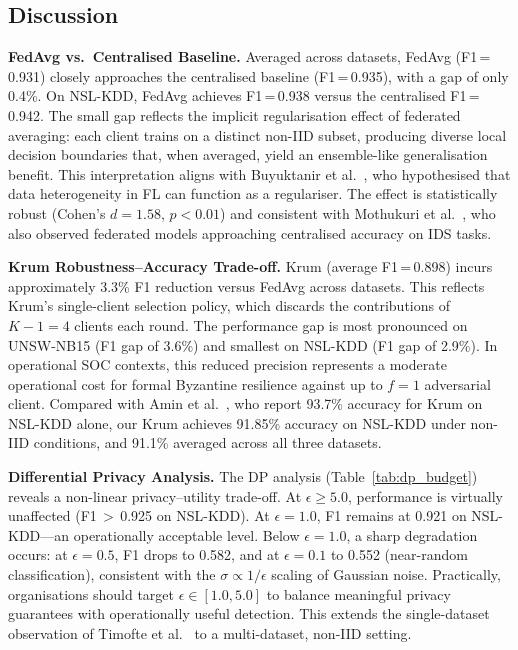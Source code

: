 \documentclass[conference]{IEEEtran}
\begin{document}
\subsection{Discussion}

\textbf{FedAvg vs.\ Centralised Baseline.}
Averaged across datasets, FedAvg (F1\,=\,0.931) closely approaches
the centralised baseline (F1\,=\,0.935), with a gap of only 0.4\%.
On NSL-KDD, FedAvg achieves F1\,=\,0.938 versus the centralised
F1\,=\,0.942. The small gap reflects the implicit regularisation
effect of federated averaging: each client trains on a distinct
non-IID subset, producing diverse local decision boundaries that,
when averaged, yield an ensemble-like generalisation benefit.
This interpretation aligns with Buyuktanir et al.~\cite{buyuktanir2025},
who hypothesised that data heterogeneity in FL can function as a
regulariser.
The effect is statistically robust (Cohen's $d = 1.58$,
$p < 0.01$) and consistent with Mothukuri et al.~\cite{mothukuri2021},
who also observed federated models approaching centralised accuracy on
IDS tasks.

\textbf{Krum Robustness--Accuracy Trade-off.}
Krum (average F1\,=\,0.898) incurs approximately 3.3\% F1 reduction
versus FedAvg across datasets.
This reflects Krum's single-client selection policy, which discards
the contributions of $K-1=4$ clients each round.
The performance gap is most pronounced on UNSW-NB15 (F1 gap of 3.6\%)
and smallest on NSL-KDD (F1 gap of 2.9\%).
In operational SOC contexts, this reduced precision represents a moderate
operational cost for formal Byzantine resilience against up to $f=1$
adversarial client.
Compared with Amin et al.~\cite{amin2025}, who report 93.7\% accuracy
for Krum on NSL-KDD alone, our Krum achieves 91.85\% accuracy on
NSL-KDD under non-IID conditions, and 91.1\% averaged across all
three datasets.

\textbf{Differential Privacy Analysis.}
The DP analysis (Table~\ref{tab:dp_budget}) reveals a non-linear
privacy--utility trade-off.
At $\epsilon \geq 5.0$, performance is virtually unaffected
(F1\,$>$\,0.925 on NSL-KDD).
At $\epsilon = 1.0$, F1 remains at 0.921 on NSL-KDD---an operationally
acceptable level.
Below $\epsilon = 1.0$, a sharp degradation occurs: at $\epsilon=0.5$,
F1 drops to 0.582, and at $\epsilon=0.1$ to 0.552 (near-random
classification), consistent with the $\sigma \propto 1/\epsilon$
scaling of Gaussian noise.
Practically, organisations should target
$\epsilon \in [1.0, 5.0]$ to balance meaningful privacy guarantees
with operationally useful detection.
This extends the single-dataset observation of Timofte et
al.~\cite{timofte2025} to a multi-dataset, non-IID setting.
\end{document}
